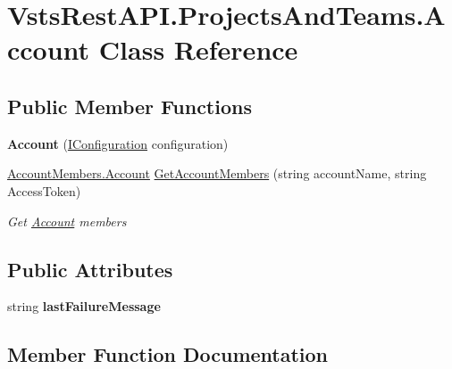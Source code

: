 \hypertarget{class_vsts_rest_a_p_i_1_1_projects_and_teams_1_1_account}{}\section{Vsts\+Rest\+A\+P\+I.\+Projects\+And\+Teams.\+Account Class Reference}
\label{class_vsts_rest_a_p_i_1_1_projects_and_teams_1_1_account}
\subsection*{Public Member Functions}
\begin{DoxyCompactItemize}
\item 
\mbox{\label{class_vsts_rest_a_p_i_1_1_projects_and_teams_1_1_account_a3311df1b111ffd6c3fbcb7162f0fb400}} 
{\bfseries Account} (\mbox{\hyperlink{interface_vsts_rest_a_p_i_1_1_i_configuration}{I\+Configuration}} configuration)
\item 
\mbox{\hyperlink{class_vsts_rest_a_p_i_1_1_viewmodel_1_1_project_and_teams_1_1_account_members_1_1_account}{Account\+Members.\+Account}} \mbox{\hyperlink{class_vsts_rest_a_p_i_1_1_projects_and_teams_1_1_account_a0b98e88fa8e05a3d17b55a0932e1e8f6}{Get\+Account\+Members}} (string account\+Name, string Access\+Token)
\begin{DoxyCompactList}\small\item\em Get \mbox{\hyperlink{class_vsts_rest_a_p_i_1_1_projects_and_teams_1_1_account}{Account}} members \end{DoxyCompactList}\end{DoxyCompactItemize}
\subsection*{Public Attributes}
\begin{DoxyCompactItemize}
\item 
\mbox{\label{class_vsts_rest_a_p_i_1_1_projects_and_teams_1_1_account_ab46ba987676d8cb72e787e4eefbb4055}} 
string {\bfseries last\+Failure\+Message}
\end{DoxyCompactItemize}


\subsection{Member Function Documentation}
\mbox{\label{class_vsts_rest_a_p_i_1_1_projects_and_teams_1_1_account_a0b98e88fa8e05a3d17b55a0932e1e8f6}} 
